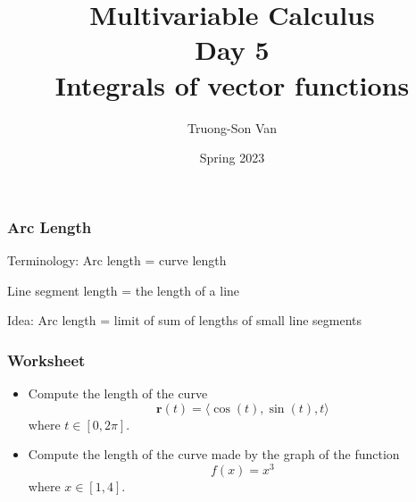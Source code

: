 \documentclass[aspectratio=169]{beamer}
\title{ Multivariable Calculus \\ Day 5 \\ Integrals of vector functions}
\institute{Fulbright University Vietnam}
\author{Truong-Son Van}
\date{Spring 2023}
\newcommand{\vect}{\mathbf}
\begin{document}
\maketitle

\begin{frame}
    \frametitle{Arc Length}
    Terminology:
    Arc length = curve length

    Line segment length = the length of a line

    Idea:
    Arc length = limit of sum of lengths of small line segments
\end{frame}

\begin{frame}
    \frametitle{Worksheet}
    \begin{itemize}
        \item Compute the length of the curve
            $$\vect{r}(t) =  \langle \cos(t) ,\sin(t), t \rangle$$
            where $t\in [0,2\pi]$.
        \item Compute the length of the curve made by the graph of the function
    $$ f(x) = x^3 $$
    where $x \in [1,4]$.
    \end{itemize}
\end{frame}
\end{document}
